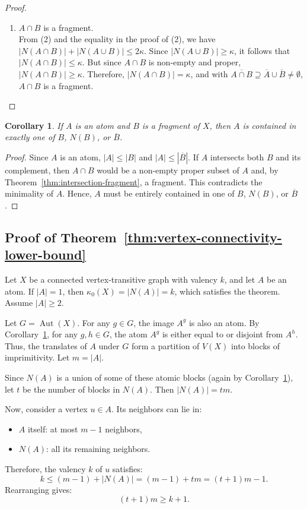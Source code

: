 \documentclass[12pt,a4paper,openany]{book}
\newtheorem{corollary}{Corollary}[section]
\begin{document}
\begin{proof}
\begin{enumerate}
    \item[(4)] $A \cap B$ is a fragment. \\
    From (2) and the equality in the proof of (2), we have $|N(A \cap B)| + |N(A \cup B)| \leq 2\kappa$. Since $|N(A \cup B)| \geq \kappa$, it follows that $|N(A \cap B)| \leq \kappa$. But since $A \cap B$ is non-empty and proper, $|N(A \cap B)| \geq \kappa$. Therefore, $|N(A \cap B)| = \kappa$, and with $\overline{A \cap B} \supseteq \overline{A} \cup \overline{B} \neq \emptyset$, $A \cap B$ is a fragment. \qedhere
\end{enumerate}
\end{proof}

\begin{corollary}\label{cor:atom-subset}
If $A$ is an atom and $B$ is a fragment of $X$, then $A$ is contained in exactly one of $B$, $N(B)$, or $\overline{B}$.
\end{corollary}
\begin{proof}
Since $A$ is an atom, $|A| \leq |B|$ and $|A| \leq |\overline{B}|$. If $A$ intersects both $B$ and its complement, then $A \cap B$ would be a non-empty proper subset of $A$ and, by Theorem~\ref{thm:intersection-fragment}, a fragment. This contradicts the minimality of $A$. Hence, $A$ must be entirely contained in one of $B$, $N(B)$, or $\overline{B}$.
\end{proof}

\subsection*{Proof of Theorem~\ref{thm:vertex-connectivity-lower-bound}}

Let $X$ be a connected vertex-transitive graph with valency $k$, and let $A$ be an atom. If $|A| = 1$, then $\kappa_0(X) = |N(A)| = k$, which satisfies the theorem. Assume $|A| \geq 2$.

Let $G = \operatorname{Aut}(X)$. For any $g \in G$, the image $A^g$ is also an atom. By Corollary~\ref{cor:atom-subset}, for any $g, h \in G$, the atom $A^g$ is either equal to or disjoint from $A^h$. Thus, the translates of $A$ under $G$ form a partition of $V(X)$ into blocks of imprimitivity. Let $m = |A|$.

Since $N(A)$ is a union of some of these atomic blocks (again by Corollary~\ref{cor:atom-subset}), let $t$ be the number of blocks in $N(A)$. Then $|N(A)| = t m$.

Now, consider a vertex $u \in A$. Its neighbors can lie in:
\begin{itemize}
    \item $A$ itself: at most $m - 1$ neighbors,
    \item $N(A)$: all its remaining neighbors.
\end{itemize}
Therefore, the valency $k$ of $u$ satisfies:
\[
k \leq (m - 1) + |N(A)| = (m - 1) + t m = (t + 1)m - 1.
\]
Rearranging gives:
\[
(t + 1)m \geq k + 1. \tag{1}
\]
\end{document}
